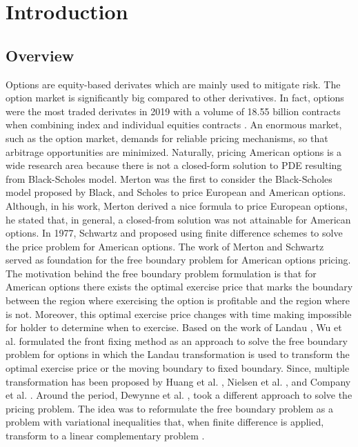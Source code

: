\section{Introduction}

\subsection{Overview}

Options are equity-based derivates which are mainly used to mitigate risk. 
The option market is significantly big compared to other derivatives. 
In fact, options were the most traded 
derivates in 2019 with a volume of 18.55 billion contracts when combining 
index and individual equities contracts \cite{statista_2019}. 
An enormous market, such as the option market, demands for reliable pricing 
mechanisms, so that arbitrage opportunities are minimized. Naturally, pricing 
American options is a wide research area because there is not a closed-form
solution to PDE resulting from Black-Scholes model.  Merton \cite{merton_1973} was the first to consider the Black-Scholes model 
proposed by Black, and Scholes \cite{black_scholes_1973} to price European
and American options. Although, in his work, Merton derived a nice formula 
to price European options, he stated that, in general, a closed-from solution 
was not attainable for American options. In 1977, Schwartz \cite*{schwartz_197779}
and \cite{brennan_1997} proposed using finite difference schemes 
to solve the price problem for American options. The work of Merton and Schwartz
served as foundation for the free boundary problem for American options pricing. The motivation behind the free boundary problem formulation is that for American options there exists the optimal exercise price that marks the boundary between the region where exercising the option is profitable and the region where is not. Moreover, this optimal exercise price changes with time making impossible for holder to determine when to exercise. Based on the work of Landau \cite*{landau_1950_heat_ci}, Wu et al. \cite{wu1997front} formulated the front fixing method as an approach to solve the free boundary problem for options in which the Landau transformation is used to transform the optimal exercise price or the moving boundary to fixed boundary. Since, multiple transformation has been proposed by Huang et al. \cite*{huang_2000}, Nielsen et al. \cite*{nielsen_2001}, and Company et al. \cite*{company_egorova_jodar_2014}. Around the period, 
Dewynne et al. \cite*{dewynne_howison_rupf_wilmott_1993}, took a different approach to solve the pricing problem. The idea was to reformulate the free boundary problem as a problem with variational inequalities that, when finite difference is applied, transform to a linear complementary problem \cite{dantzig_1968}.

